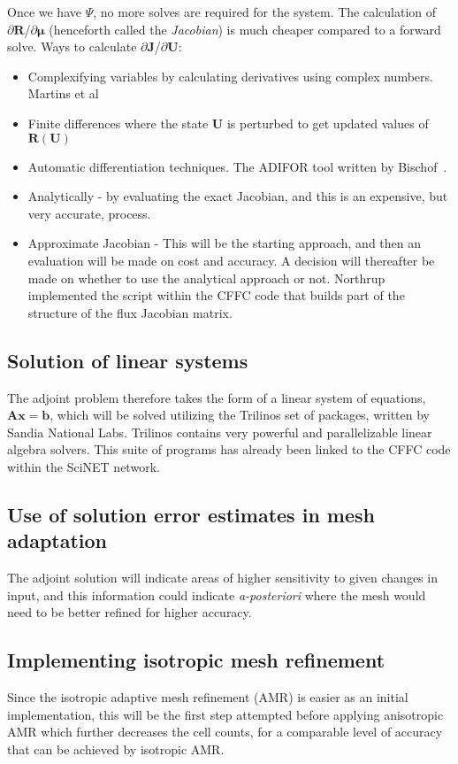 Once we have $\Psi$, no more solves are required for the system. The calculation of ${\partial \mathbf{R}}$/$\partial{\mathbf{\mu}}$ (henceforth called the \textit{Jacobian}) is much cheaper compared to a forward solve. Ways to calculate ${\partial{\mathbf{J}}}$/${\partial{\mathbf{U}}}$:
\begin{itemize}
\item Complexifying variables by calculating derivatives using complex numbers. Martins et al~\cite{Martins:2003}
\item Finite differences where the state $\mathbf{U}$ is perturbed to get updated values of $\mathbf{R}(\mathbf{U})$ 
\item Automatic differentiation techniques. The ADIFOR tool written by Bischof~\cite{Bischof94theadifor}.
\item Analytically - by evaluating the exact Jacobian, and this is an expensive, but very accurate, process.
\item Approximate Jacobian - This will be the starting approach, and then an evaluation will be made on cost and accuracy. A decision will thereafter be made on whether to use the analytical approach or not. Northrup \cite{Northrup:2013} implemented the script within the CFFC code that builds part of the structure of the flux Jacobian matrix.
\end{itemize}

\subsection{Solution of linear systems}
The adjoint problem therefore takes the form of a linear system of equations, $\mathbf{Ax}=\mathbf{b}$, which will be solved utilizing the Trilinos set of packages, written by Sandia National Labs. Trilinos contains very powerful and parallelizable linear algebra solvers. This suite of programs has already been linked to the CFFC code within the SciNET network.

\subsection{Use of solution error estimates in mesh adaptation}
The adjoint solution will indicate areas of higher sensitivity to given changes in input, and this information could indicate \textit{a-posteriori} where the mesh would need to be better refined for higher accuracy.

\subsection{Implementing isotropic mesh refinement}
Since the isotropic adaptive mesh refinement (AMR) is easier as an initial implementation, this will be the first step attempted before applying anisotropic AMR which further decreases the cell counts, for a comparable level of accuracy that can be achieved by isotropic AMR.

